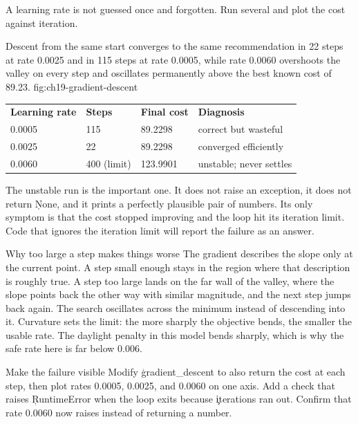 
A learning rate is not guessed once and forgotten. Run several and plot the
cost against iteration.

{Descent from the same start converges to the same recommendation in 22 steps at rate 0.0025 and in 115 steps at rate 0.0005, while rate 0.0060 overshoots the valley on every step and oscillates permanently above the best known cost of 89.23.}
{fig:ch19-gradient-descent}

\begin{center}
\begin{tabular}{llll}
\textbf{Learning rate} & \textbf{Steps} & \textbf{Final cost} & \textbf{Diagnosis} \\
0.0005 & 115 & 89.2298 & correct but wasteful \\
0.0025 & 22 & 89.2298 & converged efficiently \\
0.0060 & 400 (limit) & 123.9901 & unstable; never settles \\
\end{tabular}
\end{center}

The unstable run is the important one. It does not raise an exception, it does
not return \c{None}, and it prints a perfectly plausible pair of numbers. Its
only symptom is that the cost stopped improving and the loop hit its iteration
limit. Code that ignores the iteration limit will report the failure as an
answer.

\begin{ExplainBox}{Why too large a step makes things worse}
The gradient describes the slope only at the current point. A step small enough
stays in the region where that description is roughly true. A step too large
lands on the far wall of the valley, where the slope points back the other way
with similar magnitude, and the next step jumps back again. The search
oscillates across the minimum instead of descending into it. Curvature sets the
limit: the more sharply the objective bends, the smaller the usable rate. The
daylight penalty in this model bends sharply, which is why the safe rate here
is far below 0.006.
\end{ExplainBox}

\begin{TryBox}{Make the failure visible}
Modify \c{gradient_descent} to also return the cost at each step, then plot
rates 0.0005, 0.0025, and 0.0060 on one axis. Add a check that raises
\c{RuntimeError} when the loop exits because \c{iterations} ran out. Confirm
that rate 0.0060 now raises instead of returning a number.
\end{TryBox}

